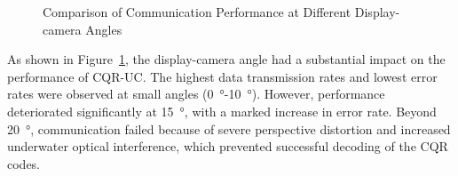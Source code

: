 \documentclass[preprint,12pt]{elsarticle}
\begin{document}
\begin{figure}[H]
    \caption{Comparison of Communication Performance at Different Display-camera Angles}
    \label{tab:angle_transmission}
\end{figure}

As shown in Figure~\ref{tab:angle_transmission}, the display-camera angle had a substantial impact on the performance of CQR-UC. The highest data transmission rates and lowest error rates were observed at small angles (\SI{0}{\degree}-\SI{10}{\degree}). However, performance deteriorated significantly at \SI{15}{\degree}, with a marked increase in error rate. 
Beyond \SI{20}{\degree}, communication failed because of severe perspective distortion and increased underwater optical interference, which prevented successful decoding of the CQR codes.
\end{document}
